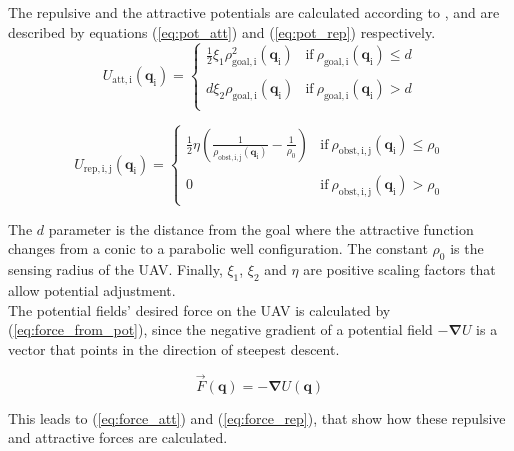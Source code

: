 \documentclass[journal]{IEEEtran}
\newcommand*{\subb}[1]{_{\mathrm{#1}}}
\begin{document}
		The repulsive and the attractive potentials are calculated according to \cite{potfieldsmethod}, and are described by equations (\ref{eq:pot_att}) and (\ref{eq:pot_rep}) respectively.
		\begin{equation} \label{eq:pot_att}
		U\subb{att, i}(\bm{q}\subb{i}) =  \left\lbrace  {\begin{array}{cc}
			\frac{1}{2} \xi\subb{1} \rho\subb{goal, i}^2(\bm{q}\subb{i})& \textrm{if} \ \rho\subb{goal, i}(\bm{q}\subb{i})\leq d \\
			\\
			d \xi\subb{2} \rho\subb{goal, i}(\bm{q}\subb{i}) &\textrm{if} \ \rho\subb{goal, i}(\bm{q}\subb{i})> d \\
			\end{array} } \right.
		\end{equation}
		
		\begin{equation} \label{eq:pot_rep}
		U\subb{rep, i,j}(\bm{q}\subb{i}) =  \left\lbrace  {\begin{array}{cc}
			\frac{1}{2} \eta (\frac{1}{\rho\subb{obst,i,j}(\bm{q}\subb{i})} - \frac{1}{\rho\subb{0}}) &\textrm{if} \ \rho\subb{obst,i,j}(\bm{q}\subb{i})\leq \rho\subb{0} \\
			\\
			0 &\textrm{if} \ \rho\subb{obst,i,j}(\bm{q}\subb{i})> \rho\subb{0} \\
			\end{array} } \right.
		\end{equation}		
		
		The $d$ parameter is the distance from the goal where the attractive function changes from a conic to a parabolic well configuration. The constant $\rho\subb{0}$ is the sensing radius of the UAV. Finally, $\xi\subb{1}$, $\xi\subb{2}$ and $\eta$ are positive scaling factors that allow potential adjustment. \\
		
		The potential fields' desired force on the UAV is calculated by (\ref{eq:force_from_pot}), since the negative gradient of a potential field $-\bm{\nabla} U$ is a vector that points in the direction of steepest descent. 
		
		\begin{equation} \label{eq:force_from_pot}
		\vec{F}(\bm{q}) = - \bm{\nabla} U(\bm{q})
		\end{equation}
		
		This leads to (\ref{eq:force_att}) and (\ref{eq:force_rep}), that show how these repulsive and attractive forces are calculated.
		
\end{document}
